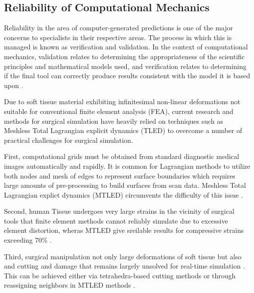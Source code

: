 \subsection{Reliability of Computational Mechanics}

Reliability in the area of computer-generated predictions is one of the major concerns to specialists in their respective areas. The process in which this is managed is known as verification and validation. In the context of computational mechanics, validation relates to determining the appropriateness of the scientific principles and mathematical models used, and verification relates to determining if the final tool can correctly produce results consistent with the model it is based upon \cite{TinsleyOden2003}.

Due to soft tissue material exhibiting infinitesimal non-linear deformations not suitable for conventional finite element analysis (FEA), \cite{Wittek2007} current research and methods for surgical simulation have heavily relied on techniques such as Meshless Total Lagrangian explicit dynamics (TLED) to overcome a number of practical challenges for surgical simulation.

First, computational grids must be obtained from standard diagnostic medical images automatically and rapidly. It is common for Lagrangian methods to utilize both nodes and mesh of edges to represent surface boundaries which requires large amounts of pre-processing to build surfaces from scan data. Meshless Total Lagrangian explict dynamics (MTLED) circumvents the difficulty of this issue \cite{Joldes2019}.

Second, human Tissue undergoes very large strains in the vicinity of surgical tools that finite element methods cannot reliably simulate due to excessive element distortion, wheras MTLED give sreilable results for compressive strains exceeding 70\% \cite{Joldes2019}.

Third, surgical manipulation not only large deformations of soft tissue but also and cutting and damage that remains largely unsolved for real-time simulation \cite{Joldes2019}. This can be achieved either via tetrahedra-based cutting methods \cite{10.1007/978-1-4419-9619-0_7} or through reassigning neighbors in MTLED methods \cite{Joldes2019}.

